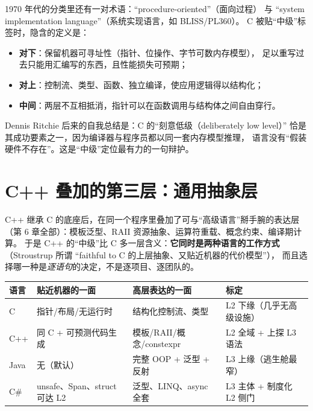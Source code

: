 \documentclass[12pt,a4paper,fontset=fandol]{ctexbook}
\begin{document}
1970 年代的分类里还有一对术语：``procedure-oriented''（面向过程）
与 ``system implementation language''（系统实现语言，如 BLISS/PL360）。
C 被贴``中级''标签时，隐含的定义是：

\begin{itemize}
  \item \textbf{对下}：保留机器可寻址性（指针、位操作、字节可数内存模型），
        足以重写过去只能用汇编写的东西，且性能损失可预期；
  \item \textbf{对上}：控制流、类型、函数、独立编译，使应用逻辑得以结构化；
  \item \textbf{中间}：两层不互相抵消，指针可以在函数调用与结构体之间自由穿行。
\end{itemize}

Dennis Ritchie 后来的自我总结是：C 的``刻意低级（deliberately low level）''
恰是其成功要素之一，因为编译器与程序员都以同一套内存模型推理，
语言没有``假装硬件不存在''。这是``中级''定位最有力的一句辩护。

\section{C++ 叠加的第三层：通用抽象层}

C++ 继承 C 的底座后，在同一个程序里叠加了可与``高级语言''掰手腕的表达层
（第 6 章全部）：模板泛型、RAII 资源抽象、运算符重载、概念约束、编译期计算。
于是 C++ 的``中级''比 C 多一层含义：\textbf{它同时是两种语言的工作方式}
（Stroustrup 所谓 ``faithful to C 的上层抽象、又贴近机器的代价模型''），
而且选择哪一种是\emph{逐语句}的决定，不是逐项目、逐团队的。

\begin{levelspectrum}[title=``中级''在四个语言上的标定]
\begin{tabular}{@{}>{\raggedright\arraybackslash}p{}>{\raggedright\arraybackslash}p{}>{\raggedright\arraybackslash}p{}>{\raggedright\arraybackslash}p{}@{}}
\toprule
\textbf{语言} & \textbf{贴近机器的一面} & \textbf{高层表达的一面} & \textbf{标定} \\
\midrule
C & 指针/布局/无运行时 & 结构化控制流、类型 & L2 下缘（几乎无高级设施） \\
C++ & 同 C + 可预测代码生成 & 模板/RAII/概念/constexpr & L2 全域 + 上探 L3 语法 \\
Java & 无（默认） & 完整 OOP + 泛型 + 反射 & L3 上缘（逃生舱最窄） \\
C\# & unsafe、Span、struct 可达 L2 & 泛型、LINQ、async 全套 & L3 主体 + 制度化 L2 侧门 \\
\bottomrule
\end{tabular}
\end{levelspectrum}
\end{document}
